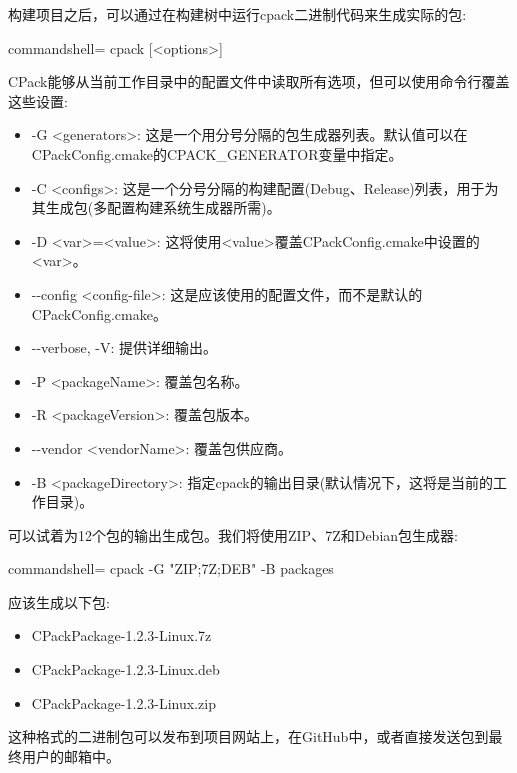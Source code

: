 构建项目之后，可以通过在构建树中运行cpack二进制代码来生成实际的包:

\begin{tcblisting}{commandshell={}}
cpack [<options>]
\end{tcblisting}

CPack能够从当前工作目录中的配置文件中读取所有选项，但可以使用命令行覆盖这些设置:

\begin{itemize}
\item 
-G <generators>: 这是一个用分号分隔的包生成器列表。默认值可以在CPackConfig.cmake的CPACK\_GENERATOR变量中指定。

\item 
-C <configs>: 这是一个分号分隔的构建配置(Debug、Release)列表，用于为其生成包(多配置构建系统生成器所需)。

\item 
-D <var>=<value>: 这将使用<value>覆盖CPackConfig.cmake中设置的<var>。

\item 
-{}-config <config-file>: 这是应该使用的配置文件，而不是默认的CPackConfig.cmake。

\item 
-{}-verbose, -V: 提供详细输出。

\item 
-P <packageName>: 覆盖包名称。

\item 
-R <packageVersion>: 覆盖包版本。

\item 
-{}-vendor <vendorName>: 覆盖包供应商。

\item 
-B <packageDirectory>: 指定cpack的输出目录(默认情况下，这将是当前的工作目录)。
\end{itemize}

可以试着为12个包的输出生成包。我们将使用ZIP、7Z和Debian包生成器:

\begin{tcblisting}{commandshell={}}
cpack -G "ZIP;7Z;DEB" -B packages
\end{tcblisting}

应该生成以下包:

\begin{itemize}
\item 
CPackPackage-1.2.3-Linux.7z

\item 
CPackPackage-1.2.3-Linux.deb

\item 
CPackPackage-1.2.3-Linux.zip
\end{itemize}

这种格式的二进制包可以发布到项目网站上，在GitHub中，或者直接发送包到最终用户的邮箱中。












